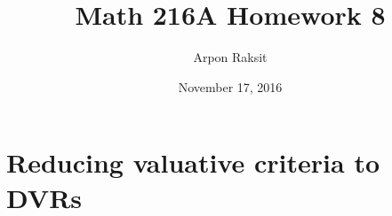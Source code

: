 

\title{Math 216A Homework 8}
\author{Arpon Raksit}
\date{November 17, 2016}




\maketitle



\section{Reducing valuative criteria to DVRs}

